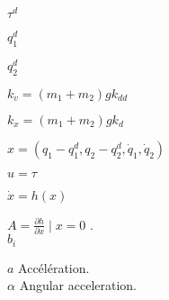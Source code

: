 \documentclass[a4paper,12pt]{report}
\begin{document}
$	\tau^{d} $

$	q_{1}^{d} $

$	q_{2}^{d} $

$	k_{v} = ( m_{1} + m_{2})g k_{dd} $

$	k_{x} = ( m_{1} + m_{2})g k_{d} $

$	x = (q_{1} - q_{1}^{d}, q_{2} - q_{2}^{d}, \dot{q}_{1}, \dot{q}_{2}) $

$	 u = \tau $

$	\dot{x} = h(x) $

$	A = \frac{\partial h}{\partial x} \mid x = 0 $
.\\
$	b_{i} $

$	a $
Accélération.\\

$	\alpha $
Angular acceleration.\\
\end{document}
